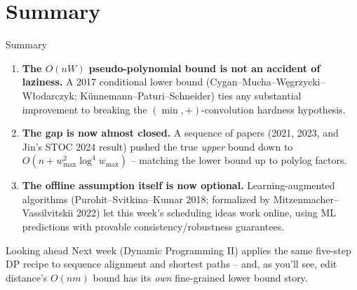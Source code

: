 \documentclass[11pt,aspectratio=169]{beamer}
\begin{document}
\section{Summary}

\begin{frame}{Summary}
  \small
  \begin{enumerate}
    \item \textbf{The $O(nW)$ pseudo-polynomial bound is not an accident of laziness.}
    A 2017 conditional lower bound (Cygan--Mucha--Węgrzycki--Włodarczyk;
    Künnemann--Paturi--Schneider) ties any substantial improvement to breaking the
    $(\min,+)$-convolution hardness hypothesis.
    \item \textbf{The gap is now almost closed.} A sequence of papers (2021, 2023, and
    Jin's STOC 2024 result) pushed the true \emph{upper} bound down to
    $O(n+w_{\max}^2\log^4 w_{\max})$ -- matching the lower bound up to polylog factors.
    \item \textbf{The offline assumption itself is now optional.} Learning-augmented
    algorithms (Purohit--Svitkina--Kumar 2018; formalized by Mitzenmacher--Vassilvitskii
    2022) let this week's scheduling ideas work online, using ML predictions with
    provable consistency/robustness guarantees.
  \end{enumerate}
  \begin{alertblock}{Looking ahead}
    Next week (Dynamic Programming II) applies the same five-step DP recipe to sequence
    alignment and shortest paths -- and, as you'll see, edit distance's $O(nm)$ bound has
    its \emph{own} fine-grained lower bound story.
  \end{alertblock}
\end{frame}
\end{document}
